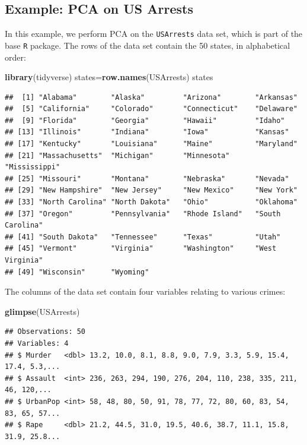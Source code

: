 \documentclass[
  openany]{book}
\newenvironment{Shaded}{\begin{snugshade}}{\end{snugshade}}
\newcommand{\KeywordTok}[1]{\textcolor[rgb]{0.13,0.29,0.53}{\textbf{#1}}}
\newcommand{\NormalTok}[1]{#1}
\begin{document}
\hypertarget{example-pca-on-us-arrests}{%
\subsection{Example: PCA on US Arrests}\label{example-pca-on-us-arrests}}

In this example, we perform PCA on the \texttt{USArrests} data set, which is part of
the base \texttt{R} package. The rows of the data set contain the 50 states, in
alphabetical order:

\begin{Shaded}
\begin{Highlighting}[]
\KeywordTok{library}\NormalTok{(tidyverse)}
\NormalTok{states=}\KeywordTok{row.names}\NormalTok{(USArrests)}
\NormalTok{states}
\end{Highlighting}
\end{Shaded}

\begin{verbatim}
##  [1] "Alabama"        "Alaska"         "Arizona"        "Arkansas"      
##  [5] "California"     "Colorado"       "Connecticut"    "Delaware"      
##  [9] "Florida"        "Georgia"        "Hawaii"         "Idaho"         
## [13] "Illinois"       "Indiana"        "Iowa"           "Kansas"        
## [17] "Kentucky"       "Louisiana"      "Maine"          "Maryland"      
## [21] "Massachusetts"  "Michigan"       "Minnesota"      "Mississippi"   
## [25] "Missouri"       "Montana"        "Nebraska"       "Nevada"        
## [29] "New Hampshire"  "New Jersey"     "New Mexico"     "New York"      
## [33] "North Carolina" "North Dakota"   "Ohio"           "Oklahoma"      
## [37] "Oregon"         "Pennsylvania"   "Rhode Island"   "South Carolina"
## [41] "South Dakota"   "Tennessee"      "Texas"          "Utah"          
## [45] "Vermont"        "Virginia"       "Washington"     "West Virginia" 
## [49] "Wisconsin"      "Wyoming"
\end{verbatim}

The columns of the data set contain four variables relating to various crimes:

\begin{Shaded}
\begin{Highlighting}[]
\KeywordTok{glimpse}\NormalTok{(USArrests)}
\end{Highlighting}
\end{Shaded}

\begin{verbatim}
## Observations: 50
## Variables: 4
## $ Murder   <dbl> 13.2, 10.0, 8.1, 8.8, 9.0, 7.9, 3.3, 5.9, 15.4, 17.4, 5.3,...
## $ Assault  <int> 236, 263, 294, 190, 276, 204, 110, 238, 335, 211, 46, 120,...
## $ UrbanPop <int> 58, 48, 80, 50, 91, 78, 77, 72, 80, 60, 83, 54, 83, 65, 57...
## $ Rape     <dbl> 21.2, 44.5, 31.0, 19.5, 40.6, 38.7, 11.1, 15.8, 31.9, 25.8...
\end{verbatim}
\end{document}
